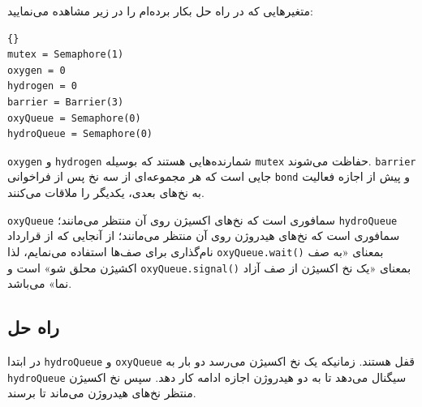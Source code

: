 \documentclass{book}
\newcommand{\clearemptydoublepage}{\newpage\cleardoublepage}
\begin{document}
    متغیرهایی که در راه حل بکار برده‌ام را در زیر مشاهده می‌نمایید:

\begin{latin}
\begin{latin}
\begin{lstlisting}[title=\rl{راهنمایی ساخت آب}]{}
mutex = Semaphore(1)
oxygen = 0
hydrogen = 0
barrier = Barrier(3)
oxyQueue = Semaphore(0)
hydroQueue = Semaphore(0)
\end{lstlisting}
\end{latin}
\end{latin}

    {\tt oxygen} و {\tt hydrogen} شمارنده‌هایی هستند که بوسیله {\tt mutex} حفاظت می‌شوند. {\tt barrier} 
    جایی است که هر مجموعه‌ای از سه نخ پس از فراخوانی {\tt bond} و پیش از اجازه فعالیت به نخ‌های بعدی، یکدیگر را ملاقات می‌کنند. 
    

    {\tt oxyQueue} سمافوری است که نخ‌های اکسیژن روی آن منتظر می‌مانند؛ 
    {\tt hydroQueue} سمافوری است که نخ‌های هیدروژن روی آن منتظر می‌مانند؛ 
    از آنجایی که از قرارداد نام‌گذاری برای صف‌ها استفاده می‌نمایم، لذا {\tt oxyQueue.wait()} بمعنای «به صف اکشیژن محلق شو» است 
    و {\tt oxyQueue.signal()} بمعنای «یک نخ اکسیژن از صف آزاد نما» می‌باشد. 


\clearemptydoublepage
\subsection {راه حل  }

    در ابتدا {\tt hydroQueue} و {\tt oxyQueue} قفل هستند. زمانیکه یک نخ اکسیژن می‌رسد دو بار به {\tt hydroQueue}  سیگنال می‌دهد تا 
    به دو هیدروژن اجازه ادامه کار دهد. سپس نخ اکسیژن منتظر نخ‌های هیدروژن می‌ماند تا برسند. 
\end{document}
